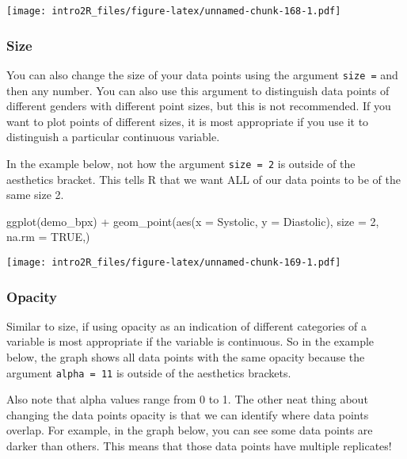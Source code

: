 \documentclass[
]{book}
\newenvironment{Shaded}{\begin{snugshade}}{\end{snugshade}}
\newcommand{\AttributeTok}[1]{\textcolor[rgb]{0.77,0.63,0.00}{#1}}
\newcommand{\ConstantTok}[1]{\textcolor[rgb]{0.00,0.00,0.00}{#1}}
\newcommand{\DecValTok}[1]{\textcolor[rgb]{0.00,0.00,0.81}{#1}}
\newcommand{\FunctionTok}[1]{\textcolor[rgb]{0.00,0.00,0.00}{#1}}
\newcommand{\NormalTok}[1]{#1}
\newcommand{\SpecialCharTok}[1]{\textcolor[rgb]{0.00,0.00,0.00}{#1}}
\begin{document}
\texttt{[image: intro2R\_files/figure-latex/unnamed-chunk-168-1.pdf]}

\hypertarget{size}{%
\subsubsection{Size}\label{size}}

You can also change the size of your data points using the argument \texttt{size\ =} and then any number. You can also use this argument to distinguish data points of different genders with different point sizes, but this is not recommended. If you want to plot points of different sizes, it is most appropriate if you use it to distinguish a particular continuous variable.

In the example below, not how the argument \texttt{size\ =\ 2} is outside of the aesthetics bracket. This tells R that we want ALL of our data points to be of the same size 2.

\begin{Shaded}
\begin{Highlighting}[]
\FunctionTok{ggplot}\NormalTok{(demo\_bpx) }\SpecialCharTok{+}
  \FunctionTok{geom\_point}\NormalTok{(}\FunctionTok{aes}\NormalTok{(}\AttributeTok{x =}\NormalTok{ Systolic, }\AttributeTok{y =}\NormalTok{ Diastolic),}
             \AttributeTok{size =} \DecValTok{2}\NormalTok{,}
             \AttributeTok{na.rm =} \ConstantTok{TRUE}\NormalTok{,)}
\end{Highlighting}
\end{Shaded}

\texttt{[image: intro2R\_files/figure-latex/unnamed-chunk-169-1.pdf]}

\hypertarget{opacity}{%
\subsubsection{Opacity}\label{opacity}}

Similar to size, if using opacity as an indication of different categories of a variable is most appropriate if the variable is continuous. So in the example below, the graph shows all data points with the same opacity because the argument \texttt{alpha\ =\ 11} is outside of the aesthetics brackets.

Also note that alpha values range from 0 to 1. The other neat thing about changing the data points opacity is that we can identify where data points overlap. For example, in the graph below, you can see some data points are darker than others. This means that those data points have multiple replicates!
\end{document}
